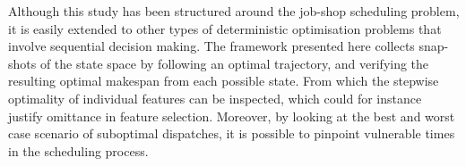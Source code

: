 \documentclass[smallextended]{svjour3}
\begin{document}
	
	Although this study has been structured around the job-shop scheduling problem, it is easily extended to other types of deterministic optimisation problems that involve sequential decision making. 	
	The framework presented here collects snap-shots of the state space by following an optimal trajectory, and verifying the resulting optimal makespan from each possible state. 
	From which the stepwise optimality of individual features can be inspected, which could for instance justify omittance in feature selection.  
	Moreover, by looking at the best and worst case scenario of suboptimal dispatches, it is possible to pinpoint vulnerable times in the scheduling process. 
	
	
	
	  
	
	
	
\end{document}
